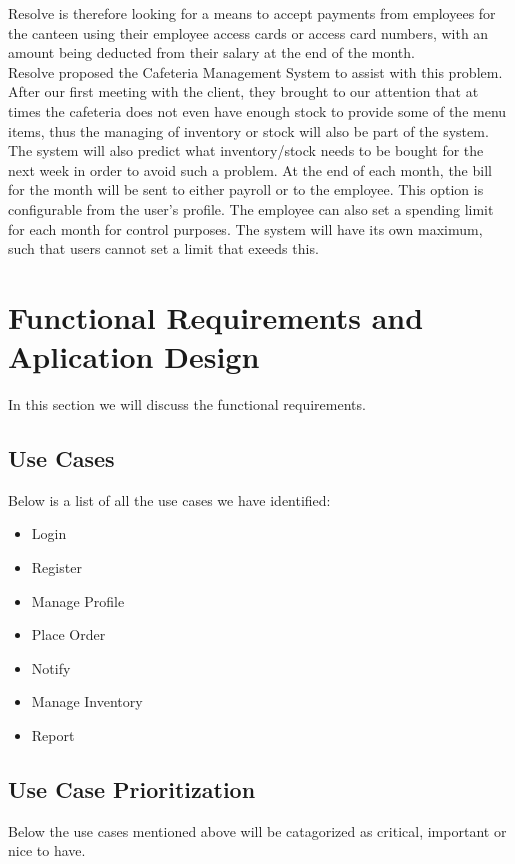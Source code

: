 \documentclass[a4paper,12pt]{article}
\begin{document}
Resolve is therefore looking for a means to accept payments from employees for the canteen using their employee access cards or access card numbers, with an amount being deducted from their salary at the end of the month.\\

Resolve proposed the Cafeteria Management System to assist with this problem.
After our first meeting with the client, they brought to our attention that at times the cafeteria does not even have enough stock to provide some of the menu items, thus the managing of inventory or stock will also be part of the system. The system will also predict what inventory/stock needs to be bought for the next week in order to avoid such a problem. At the end of each month, the bill for the month will be sent to either payroll or to the employee. This option is configurable from the user's profile. The employee can also set a spending limit for each month for control purposes. The system will have its own maximum, such that users cannot set a limit that exeeds this. 
 
\section{Functional Requirements and Aplication Design}
In this section we will discuss the functional requirements. \\

\subsection{Use Cases }
Below is a list of all the use cases we have identified:

\begin{itemize}

\item  Login
\item Register
\item Manage Profile
\item Place Order
\item Notify
\item Manage Inventory
\item Report

\end{itemize}


\subsection{Use Case Prioritization}
Below the use cases mentioned above will be catagorized as critical, important or nice to have.
\end{document}
